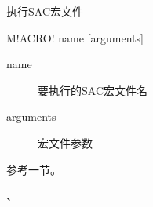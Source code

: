 \label{cmd:macro}

执行SAC宏文件

\begin{SACSTX}
M!ACRO! name [arguments]
\end{SACSTX}

\begin{description}
\item [name] 要执行的SAC宏文件名
\item [arguments] 宏文件参数
\end{description}

参考一节。

、
